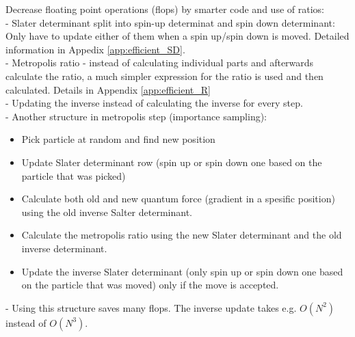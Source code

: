 Decrease floating point operations (flops) by smarter code and use of ratios:\\
- Slater determinant split into spin-up determinat and spin down determinant: Only have to update either of them when a spin up/spin down is moved. Detailed information in Appedix \ref{app:efficient_SD}. \\
- Metropolis ratio - instead of calculating individual parts and afterwards calculate the ratio, a much simpler expression for the ratio is used and then calculated. Details in Appendix \ref{app:efficient_R}\\
- Updating the inverse instead of calculating the inverse for every step. \\
- Another structure in metropolis step (importance sampling):\\
\begin{itemize}
\item Pick particle at random and find new position
\item Update Slater determinant row (spin up or spin down one based on the particle that was picked)
\item Calculate both old and new quantum force (gradient in a spesific position) using the old inverse Salter determinant.
\item Calculate the metropolis ratio using the new Slater determinant and the old inverse determinant.
\item Update the inverse Slater determinant (only spin up or spin down one based on the particle that was moved) only if the move is accepted. 
\end{itemize}
- Using this structure saves many flops. The inverse update takes e.g. $O(N^2)$ instead of $O(N^3)$.